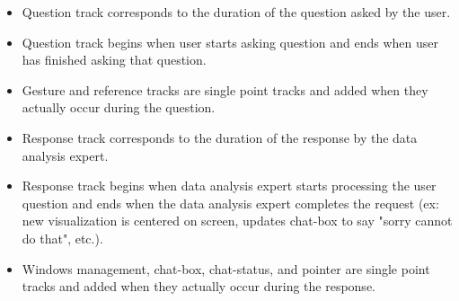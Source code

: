 \documentclass[]{article}
\begin{document}
\begin{itemize}
\item Question track corresponds to the duration of the question asked by the user. 
\item Question track begins when user starts asking question and ends when user has finished asking that question.
\item Gesture and reference tracks are single point tracks and added when they actually occur during the question.
\item Response track corresponds to the duration of the response by the data analysis expert.
\item Response track begins when data analysis expert starts processing the user question and ends when the data analysis expert completes the request (ex: new visualization is centered on screen, updates chat-box to say "sorry cannot do that", etc.).
\item Windows management, chat-box, chat-status, and pointer are single point tracks and added when they actually occur during the response.
\end{itemize}
\end{document}
